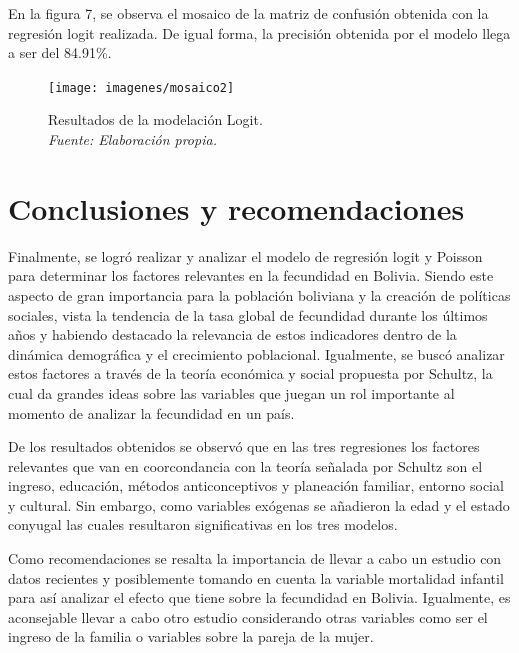 \documentclass[Royal,times,sageh]{sagej}
\begin{document}
En la figura 7, se observa el mosaico de la matriz de confusión obtenida
con la regresión logit realizada. De igual forma, la precisión obtenida
por el modelo llega a ser del 84.91\%.

\begin{figure}

{\centering \texttt{[image: imagenes/mosaico2]} 

}

\caption{Resultados de la modelación Logit.\\\textit{Fuente: Elaboración propia.}}\label{fig:unnamed-chunk-7}
\end{figure}

\section{Conclusiones y
recomendaciones}\label{conclusiones-y-recomendaciones}

Finalmente, se logró realizar y analizar el modelo de regresión logit y
Poisson para determinar los factores relevantes en la fecundidad en
Bolivia. Siendo este aspecto de gran importancia para la población
boliviana y la creación de políticas sociales, vista la tendencia de la
tasa global de fecundidad durante los últimos años y habiendo destacado
la relevancia de estos indicadores dentro de la dinámica demográfica y
el crecimiento poblacional. Igualmente, se buscó analizar estos factores
a través de la teoría económica y social propuesta por Schultz, la cual
da grandes ideas sobre las variables que juegan un rol importante al
momento de analizar la fecundidad en un país.

De los resultados obtenidos se observó que en las tres regresiones los
factores relevantes que van en coorcondancia con la teoría señalada por
Schultz son el ingreso, educación, métodos anticonceptivos y planeación
familiar, entorno social y cultural. Sin embargo, como variables
exógenas se añadieron la edad y el estado conyugal las cuales resultaron
significativas en los tres modelos.

Como recomendaciones se resalta la importancia de llevar a cabo un
estudio con datos recientes y posiblemente tomando en cuenta la variable
mortalidad infantil para así analizar el efecto que tiene sobre la
fecundidad en Bolivia. Igualmente, es aconsejable llevar a cabo otro
estudio considerando otras variables como ser el ingreso de la familia o
variables sobre la pareja de la mujer.



\end{document}
